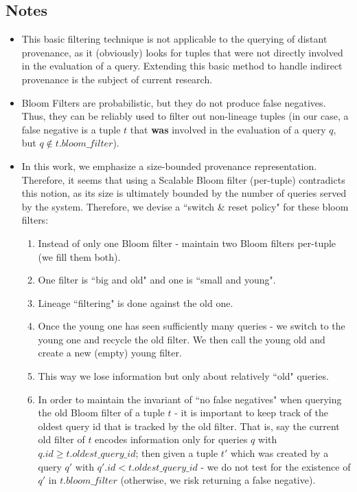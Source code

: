 \subsection{Notes} 
\begin{itemize}
    \item This basic filtering technique is not applicable to the querying of distant provenance, as it (obviously) looks for tuples that were not directly involved in the evaluation of a query. Extending this basic method to handle indirect provenance is the subject of current research.
    \item Bloom Filters are probabilistic, but they do not produce false negatives. Thus, they can be reliably used to filter out non-lineage tuples (in our case, a false negative is a tuple $t$ that \textbf{was} involved in the evaluation of a query $q$, but $q \notin t.bloom\_filter$). 
    \item In this work, we emphasize a size-bounded provenance representation. Therefore, it seems that using a Scalable Bloom filter (per-tuple) contradicts this notion, as its size is ultimately bounded by the number of queries served by the system. Therefore, we devise a ``switch \& reset policy" for these bloom filters:
    \begin{enumerate}
        \item Instead of only one Bloom filter - maintain two Bloom filters per-tuple (we fill them both).
        \item One filter is ``big and old" and one is ``small and young".
        \item Lineage ``filtering" is done against the old one.
        \item Once the young one has seen sufficiently many queries - we switch to the young one and recycle the old filter. We then call the young old and create a new (empty) young filter.
        \item This way we lose information but only about relatively ``old" queries.
        \item In order to maintain the invariant of ``no false negatives" when querying the old Bloom filter of a tuple $t$ - it is important to keep track of the oldest query id that is tracked by the old filter. That is, say the current old filter of $t$ encodes information only for queries $q$ with $q.id \geq t.oldest\_query\_id$\footnotemark; then given a tuple $t'$ which was created by a query $q'$ with $q'.id < t.oldest\_query\_id$ - we do not test for the existence of $q'$ in $t.bloom\_filter$ (otherwise, we risk returning a false negative).
    \end{enumerate}
\end{itemize}


